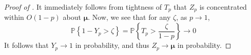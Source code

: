 \begin{proof}[Proof of ]
It immediately follows from tightness of $T_p$ that $Z_p$ is concentrated within $O(1 - p)$ about $\boldsymbol{\mu}$.
Now, we see that for any $\zeta$, as $p \to 1$,
\[
    \mathbb{P}\left\{1 - Y_p > \zeta\right\} = \mathbb{P}\left\{T_p > \frac{\zeta}{1 - p}\right\} \to 0
\]
It follows that $Y_p \to 1$ in probability, and thus $Z_p \to \boldsymbol{\mu}$ in probability.
\end{proof}
